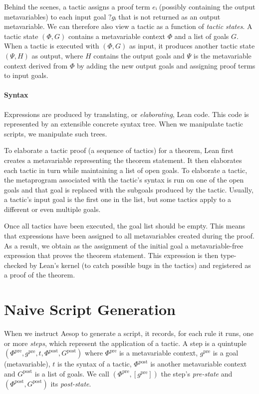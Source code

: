 \documentclass[sigplan,10pt,anonymous,review]{acmart}
\newcommand{\mvar}[1]{{?#1}}
\newcommand{\pre}{\mathrm{pre}}
\newcommand{\post}{\mathrm{post}}
\newcommand{\step}[5]{\ensuremath{(#1,\allowbreak #2,\allowbreak #3,\allowbreak #4,\allowbreak #5)}}
\begin{document}
Behind the scenes, a tactic assigns a proof term $eᵢ$ (possibly containing the output metavariables) to each input goal $\mvar{gᵢ}$ that is not returned as an output metavariable.
We can therefore also view a tactic as a function of \emph{tactic states}.
A tactic state $(Φ, G)$ contains a metavariable context $Φ$ and a list of goals $G$.
When a tactic is executed with $(Φ, G)$ as input, it produces another tactic state $(Ψ, H)$ as output, where $H$ contains the output goals and $Ψ$ is the metavariable context derived from $Φ$ by adding the new output goals and assigning proof terms to input goals.

\paragraph{Syntax}
Expressions are produced by translating, or \emph{elaborating}, Lean code.
This code is represented by an extensible concrete syntax tree.
When we manipulate tactic scripts, we manipulate such trees.

To elaborate a tactic proof (a sequence of tactics) for a theorem, Lean first creates a metavariable representing the theorem statement.
It then elaborates each tactic in turn while maintaining a list of open goals.
To elaborate a tactic, the metaprogram associated with the tactic's syntax is run on one of the open goals and that goal is replaced with the subgoals produced by the tactic.
Usually, a tactic's input goal is the first one in the list, but some tactics apply to a different or even multiple goals.

Once all tactics have been executed, the goal list should be empty.
This means that expressions have been assigned to all metavariables created during the proof.
As a result, we obtain as the assignment of the initial goal a metavariable-free expression that proves the theorem statement.
This expression is then type-checked by Lean's kernel (to catch possible bugs in the tactics) and registered as a proof of the theorem.

\section{Naive Script Generation}%
\label{sec:generation}

When we instruct Aesop to generate a script, it records, for each rule it runs, one or more \emph{steps}, which represent the application of a tactic.
A step is a quintuple $\step{Φ^{\pre}}{g^{\pre}}{t}{Φ^{\post}}{G^{\post}}$ where $Φ^{\pre}$ is a metavariable context,
$g^{\pre}$ is a goal (metavariable),
$t$ is the syntax of a tactic,
$Φ^{\post}$ is another metavariable context and $G^{\post}$ is a list of goals.
We call $(Φ^{\pre}, [g^{\pre}])$ the step's \emph{pre-state} and $(Φ^{\post}, G^{\post})$ its \emph{post-state}.
\end{document}
